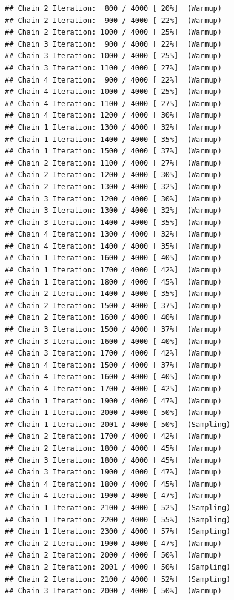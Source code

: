 \documentclass[
]{article}
\begin{document}
\begin{verbatim}
## Chain 2 Iteration:  800 / 4000 [ 20%]  (Warmup) 
## Chain 2 Iteration:  900 / 4000 [ 22%]  (Warmup) 
## Chain 2 Iteration: 1000 / 4000 [ 25%]  (Warmup) 
## Chain 3 Iteration:  900 / 4000 [ 22%]  (Warmup) 
## Chain 3 Iteration: 1000 / 4000 [ 25%]  (Warmup) 
## Chain 3 Iteration: 1100 / 4000 [ 27%]  (Warmup) 
## Chain 4 Iteration:  900 / 4000 [ 22%]  (Warmup) 
## Chain 4 Iteration: 1000 / 4000 [ 25%]  (Warmup) 
## Chain 4 Iteration: 1100 / 4000 [ 27%]  (Warmup) 
## Chain 4 Iteration: 1200 / 4000 [ 30%]  (Warmup) 
## Chain 1 Iteration: 1300 / 4000 [ 32%]  (Warmup) 
## Chain 1 Iteration: 1400 / 4000 [ 35%]  (Warmup) 
## Chain 1 Iteration: 1500 / 4000 [ 37%]  (Warmup) 
## Chain 2 Iteration: 1100 / 4000 [ 27%]  (Warmup) 
## Chain 2 Iteration: 1200 / 4000 [ 30%]  (Warmup) 
## Chain 2 Iteration: 1300 / 4000 [ 32%]  (Warmup) 
## Chain 3 Iteration: 1200 / 4000 [ 30%]  (Warmup) 
## Chain 3 Iteration: 1300 / 4000 [ 32%]  (Warmup) 
## Chain 3 Iteration: 1400 / 4000 [ 35%]  (Warmup) 
## Chain 4 Iteration: 1300 / 4000 [ 32%]  (Warmup) 
## Chain 4 Iteration: 1400 / 4000 [ 35%]  (Warmup) 
## Chain 1 Iteration: 1600 / 4000 [ 40%]  (Warmup) 
## Chain 1 Iteration: 1700 / 4000 [ 42%]  (Warmup) 
## Chain 1 Iteration: 1800 / 4000 [ 45%]  (Warmup) 
## Chain 2 Iteration: 1400 / 4000 [ 35%]  (Warmup) 
## Chain 2 Iteration: 1500 / 4000 [ 37%]  (Warmup) 
## Chain 2 Iteration: 1600 / 4000 [ 40%]  (Warmup) 
## Chain 3 Iteration: 1500 / 4000 [ 37%]  (Warmup) 
## Chain 3 Iteration: 1600 / 4000 [ 40%]  (Warmup) 
## Chain 3 Iteration: 1700 / 4000 [ 42%]  (Warmup) 
## Chain 4 Iteration: 1500 / 4000 [ 37%]  (Warmup) 
## Chain 4 Iteration: 1600 / 4000 [ 40%]  (Warmup) 
## Chain 4 Iteration: 1700 / 4000 [ 42%]  (Warmup) 
## Chain 1 Iteration: 1900 / 4000 [ 47%]  (Warmup) 
## Chain 1 Iteration: 2000 / 4000 [ 50%]  (Warmup) 
## Chain 1 Iteration: 2001 / 4000 [ 50%]  (Sampling) 
## Chain 2 Iteration: 1700 / 4000 [ 42%]  (Warmup) 
## Chain 2 Iteration: 1800 / 4000 [ 45%]  (Warmup) 
## Chain 3 Iteration: 1800 / 4000 [ 45%]  (Warmup) 
## Chain 3 Iteration: 1900 / 4000 [ 47%]  (Warmup) 
## Chain 4 Iteration: 1800 / 4000 [ 45%]  (Warmup) 
## Chain 4 Iteration: 1900 / 4000 [ 47%]  (Warmup) 
## Chain 1 Iteration: 2100 / 4000 [ 52%]  (Sampling) 
## Chain 1 Iteration: 2200 / 4000 [ 55%]  (Sampling) 
## Chain 1 Iteration: 2300 / 4000 [ 57%]  (Sampling) 
## Chain 2 Iteration: 1900 / 4000 [ 47%]  (Warmup) 
## Chain 2 Iteration: 2000 / 4000 [ 50%]  (Warmup) 
## Chain 2 Iteration: 2001 / 4000 [ 50%]  (Sampling) 
## Chain 2 Iteration: 2100 / 4000 [ 52%]  (Sampling) 
## Chain 3 Iteration: 2000 / 4000 [ 50%]  (Warmup) 

\end{verbatim}
\end{document}
